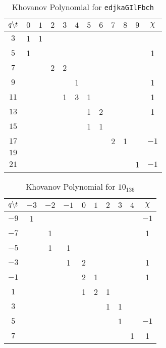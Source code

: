 \documentclass{article}
\theoremstyle{plain}
\begin{document}
        \begin{table}
            \centering
            \begin{tabular}{| c | c | c | c | c | c | c | c | c | c | c | c |}
                \hline
                $q\symbol{92}t$&$0$&$1$&$2$&$3$&$4$&$5$&$6$&$7$&$8$&$9$&$\chi$\\
                \hline
                $3$&1&1&&&&&&&&&\\
                \hline
                $5$&1&&&&&&&&&&1\\
                \hline
                $7$&&&2&2&&&&&&&\\
                \hline
                $9$&&&&&1&&&&&&1\\
                \hline
                $11$&&&&1&3&1&&&&&1\\
                \hline
                $13$&&&&&&1&2&&&&1\\
                \hline
                $15$&&&&&&1&1&&&&\\
                \hline
                $17$&&&&&&&&2&1&&$-1$\\
                \hline
                $19$&&&&&&&&&&&\\
                \hline
                $21$&&&&&&&&&&1&$-1$\\
                \hline
            \end{tabular}
            \caption{Khovanov Polynomial for \texttt{edjkaGIlFbch}}
        \end{table}
        \begin{table}
            \centering
            \begin{tabular}{| c | c | c | c | c | c | c | c | c | c |}
                \hline
                $q\symbol{92}t$&$-3$&$-2$&$-1$&$0$&$1$&$2$&$3$&$4$&$\chi$\\
                \hline
                $-9$&1&&&&&&&&$-1$\\
                \hline
                $-7$&&1&&&&&&&1\\
                \hline
                $-5$&&1&1&&&&&&\\
                \hline
                $-3$&&&1&2&&&&&1\\
                \hline
                $-1$&&&&2&1&&&&1\\
                \hline
                $1$&&&&1&2&1&&&\\
                \hline
                $3$&&&&&&1&1&&\\
                \hline
                $5$&&&&&&&1&&$-1$\\
                \hline
                $7$&&&&&&&&1&1\\
                \hline
            \end{tabular}
            \caption{Khovanov Polynomial for $10_{136}$}
        \end{table}
\end{document}
